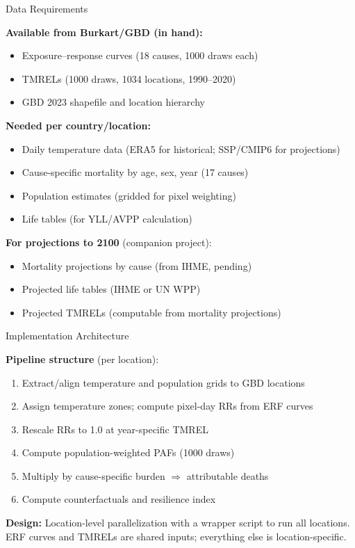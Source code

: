 \documentclass[aspectratio=169,10pt]{beamer}
\begin{document}
\begin{frame}{Data Requirements}

  \textbf{Available from Burkart/GBD (in hand):}
  \begin{itemize}
    \item Exposure--response curves (18 causes, 1000 draws each)
    \item TMRELs (1000 draws, 1034 locations, 1990--2020)
    \item GBD 2023 shapefile and location hierarchy
  \end{itemize}

  \vspace{0.5em}
  \textbf{Needed per country/location:}
  \begin{itemize}
    \item Daily temperature data (ERA5 for historical; SSP/CMIP6 for projections)
    \item Cause-specific mortality by age, sex, year (17 causes)
    \item Population estimates (gridded for pixel weighting)
    \item Life tables (for YLL/AVPP calculation)
  \end{itemize}

  \vspace{0.5em}
  \textbf{For projections to 2100} (companion project):
  \begin{itemize}
    \item Mortality projections by cause (from IHME, pending)
    \item Projected life tables (IHME or UN WPP)
    \item Projected TMRELs (computable from mortality projections)
  \end{itemize}
\end{frame}

\begin{frame}{Implementation Architecture}

  \textbf{Pipeline structure} (per location):
  \begin{enumerate}
    \item Extract/align temperature and population grids to GBD locations
    \item Assign temperature zones; compute pixel-day RRs from ERF curves
    \item Rescale RRs to 1.0 at year-specific TMREL
    \item Compute population-weighted PAFs (1000 draws)
    \item Multiply by cause-specific burden $\Rightarrow$ attributable deaths
    \item Compute counterfactuals and resilience index
  \end{enumerate}

  \vspace{0.5em}
  \textbf{Design:} Location-level parallelization with a wrapper script to run all locations. ERF curves and TMRELs are shared inputs; everything else is location-specific.
\end{frame}
\end{document}

